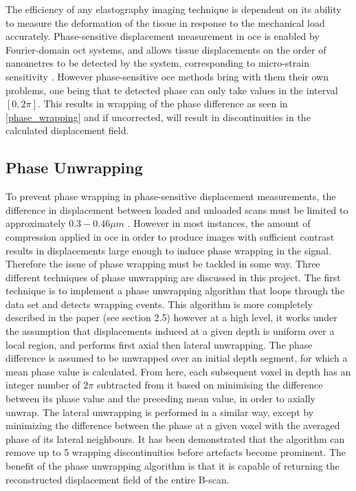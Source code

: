 The efficiency of any elastography imaging technique is dependent on its ability to measure the deformation of the tissue in response to the mechanical load accurately. Phase-sensitive displacement measurement in \ac{oce} is enabled by Fourier-domain \ac{oct} systems, and allows tissue displacements on the order of nanometres to be detected by the system, corresponding to micro-strain sensitivity \cite{kennedy_review_2014}. However phase-sensitive \ac{oce} methods bring with them their own problems, one being that te detected phase can only take values in the interval $[0,2\pi]$. This results in wrapping of the phase difference as seen in \autoref{phase_wrapping} and if uncorrected, will result in discontinuities in the calculated displacement field.

\subsection{Phase Unwrapping}
To prevent phase wrapping in phase-sensitive displacement measurements, the difference in displacement between loaded and unloaded scans must be limited to approximately $0.3-0.46\mu m$ \cite{kennedy_optical_2014}. However in most instances, the amount of compression applied in \ac{oce} in order to produce images with sufficient contrast results in displacements large enough to induce phase wrapping in the signal. Therefore the issue of phase wrapping must be tackled in some way. Three different techniques of phase unwrapping are discussed in this project. The first technique is to implement a phase unwrapping algorithm that loops through the data set and detects wrapping events. This algorithm is more completely described in the paper \cite{kennedy_optical_2014} (see section 2.5) however at a high level, it works under the assumption that displacements induced at a given depth is uniform over a local region, and performs first axial then lateral unwrapping. The phase difference is assumed to be unwrapped over an initial depth segment, for which a mean phase value is calculated. From here, each subsequent voxel in depth has an integer number of $2\pi$ subtracted from it based on minimising the difference between its phase value and the preceding mean value, in order to axially unwrap. The lateral unwrapping is performed in a similar way, except by minimizing the difference between the phase at a given voxel with the averaged phase of its lateral neighbours. It has been demonstrated that the algorithm can remove up to 5 wrapping discontinuities \cite{kennedy_optical_2014} before artefacts become prominent.
The benefit of the phase unwrapping algorithm is that it is capable of returning the reconstructed displacement field of the entire B-scan. 

